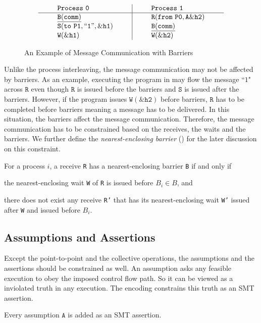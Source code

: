 \begin{figure}[h]
\[
\begin{array}{l|l}
\;\;\;\;\;\;\;\;\mathtt{Process\ 0}\;\;\;\;\;\;\;\; & \;\;\;\;\;\;\;\; \mathtt{Process\ 1}\;\;\;\;\;\;\;\; \\
\hline
\;\;\;\;\;\;\;\;\mathtt{\underline{B(comm)}}\;\;\;\;\;\;\;\; & \;\;\;\;\;\;\;\; \mathtt{R(from\ P0,A\&h2)}\;\;\;\;\;\;\;\; \\
\;\;\;\;\;\;\;\;\mathtt{S(to\ P1,``1",\&h1)}\;\;\;\;\;\;\;\; & \;\;\;\;\;\;\;\; \mathtt{\underline{B(comm)}}\;\;\;\;\;\;\;\; \\
\;\;\;\;\;\;\;\;\mathtt{W(\&h1)}\;\;\;\;\;\;\;\; & \;\;\;\;\;\;\;\; \mathtt{W(\&h2)}\;\;\;\;\;\;\;\; \\
\end{array}
\]
\caption{An Example of Message Communication with Barriers} \label{fig:mc_barrier1}
\end{figure}

Unlike the process interleaving, the message communication may not be affected by barriers. As an example, executing the program in  may flow the message ``$1$" across $\mathtt{R}$ even though $\mathtt{R}$ is issued before the barriers and $\mathtt{S}$ is issued after the barriers. However, if the program issues $\mathtt{W(\&h2)}$ before barriers, $\mathtt{R}$ has to be completed before barriers meaning a message has to be delivered. In this situation, the barriers affect the message communication. Therefore, the message communication has to be constrained based on the receives, the waits and the barriers. We further define the \textit{nearest-enclosing barrier} () for the later discussion on this constraint.

\begin{definition}\label{def:nb}
For a process $i$, a receive \texttt{R} has a nearest-enclosing barrier \texttt{B} if and only if
\begin{compactenum}
\item the nearest-enclosing wait \texttt{W} of \texttt{R} is issued before $B_i\in B$, and
\item there does not exist any receive \texttt{R'} that has its nearest-enclosing wait \texttt{W'} issued after \texttt{W} and issued before $B_i$.
\end{compactenum}
\end{definition}


\subsection{Assumptions and Assertions}
Except the point-to-point and the collective operations, the assumptions and the assertions should be constrained as well. An assumption asks any feasible execution to obey the imposed control flow path. So it can be viewed as a inviolated truth in any execution. The encoding constrains this truth as an SMT assertion.
\begin{definition}[Assumption] \label{def:assm}
Every assumption $\mathtt{A}$ is added as an SMT assertion.
\end{definition}

